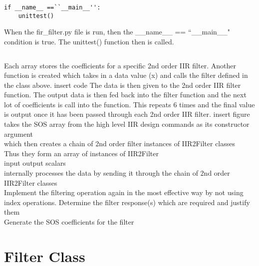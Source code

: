 \documentclass{article}
\begin{document}
\lstset{language=Python}
\begin{lstlisting}
if __name__ ==``__main__'':
    unittest()
\end{lstlisting}
When the fir\_filter.py file is run, then the \_\_name\_\_ == ``\_\_main\_\_" condition is true. The unittest() function then is called.
\lstset{language=Python}
\begin{lstlisting}

\end{lstlisting}
\newline
Each array stores the coefficients for a specific 2nd order IIR filter. Another function is created which takes in a data value (x) and calls the filter defined in the class above.
\newline 
\newline
insert code 
\newline
\newline
The data is then given to the 2nd order IIR filter function. The output data is then fed back into the filter function and the next lot of coefficients is call into the function. This repeats 6 times and the final value is output once it has been passed through each 2nd order IIR filter. 
\newline
\newline 
insert figure 
\newline
\newline
takes the SOS array from the high level IIR design commands as its constructor argument\\
which then creates a chain of 2nd order filter instances of IIR2Filter classes\\
Thus they form an array of instances of IIR2Filter\\
input output scalars\\
internally processes the data by sending it through the chain of 2nd order IIR2Filter classes\\
Implement the filtering operation again in the most effective way by not using index operations.
Determine the filter response(s) which are required and justify them\\
Generate the SOS coefficients for the filter
\section{Filter Class}
\end{document}
